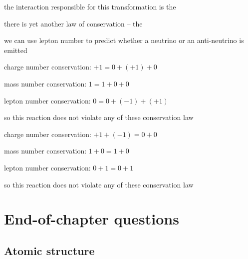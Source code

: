 the interaction responsible for this transformation is the 

\cmt there is yet another law of conservation -- the 

we can use lepton number to predict whether a neutrino or an anti-neutrino is emitted


\begin{soln} charge number conservation: $+1 = 0 + (+1) + 0$ \xskip {}

mass number conservation: $1 = 1 + 0 + 0$ \xskip {}

lepton number conservation: $0 = 0 + (-1) + (+1)$ \xskip {}

so this reaction does not violate any of these conservation law \end{soln}



\begin{soln} charge number conservation: $+1 + (-1) = 0 + 0$  \xskip {}

mass number conservation: $1 + 0 = 1 + 0$ \xskip {}

lepton number conservation: $0 + 1 = 0 + 1$  \xskip {}

so this reaction does not violate any of these conservation law \end{soln}

	
\section{End-of-chapter questions}

\subsection*{Atomic structure}

